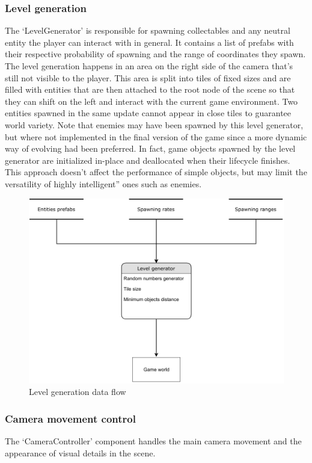 \documentclass[11pt]{article}
\begin{document}
\subsubsection{Level generation}
The ‘LevelGenerator’ is responsible for spawning collectables and any neutral entity the player can interact with in general. It contains a list of prefabs with their respective probability of spawning and the range of coordinates they spawn. The level generation happens in an area on the right side of the camera that’s still not visible to the player. This area is split into tiles of fixed sizes and are filled with entities that are then attached to the root node of the scene so that they can shift on the left and interact with the current game environment. Two entities spawned in the same update cannot appear in close tiles to guarantee world variety. Note that enemies may have been spawned by this level generator, but where not implemented in the final version of the game since a more dynamic way of evolving had been preferred. In fact, game objects spawned by the level generator are initialized in-place and deallocated when their lifecycle finishes. This approach doesn’t affect the performance of simple objects, but may limit the versatility of highly intelligent” ones such as enemies.

\begin{figure}[H]
  \centering
  \includegraphics[width=1.0\textwidth]{figures/level_generator}
  \caption{Level generation data flow}
\end{figure}

\subsubsection{Camera movement control}
The ‘CameraController’ component handles the main camera movement and the appearance of visual details in the scene.
\end{document}
